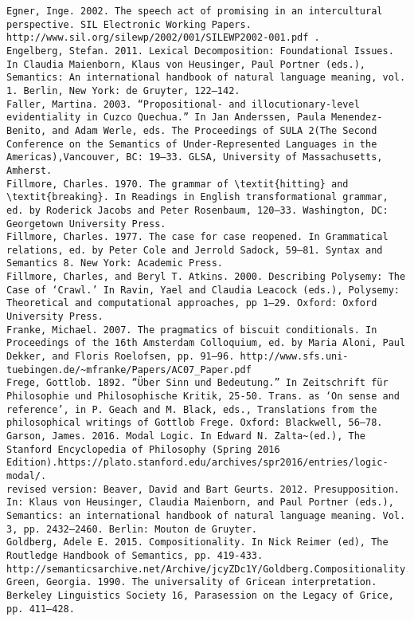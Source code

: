 \begin{verbatim}
Egner, Inge. 2002. The speech act of promising in an intercultural perspective. SIL Electronic Working Papers. http://www.sil.org/silewp/2002/001/SILEWP2002-001.pdf .
Engelberg, Stefan. 2011. Lexical Decomposition: Foundational Issues. In Claudia Maienborn, Klaus von Heusinger, Paul Portner (eds.), Semantics: An international handbook of natural language meaning, vol. 1. Berlin, New York: de Gruyter, 122–142.
Faller, Martina. 2003. “Propositional- and illocutionary-level evidentiality in Cuzco Quechua.” In Jan Anderssen, Paula Menendez-Benito, and Adam Werle, eds. The Proceedings of SULA 2(The Second Conference on the Semantics of Under-Represented Languages in the Americas),Vancouver, BC: 19–33. GLSA, University of Massachusetts, Amherst.
Fillmore, Charles. 1970. The grammar of \textit{hitting} and \textit{breaking}. In Readings in English transformational grammar, ed. by Roderick Jacobs and Peter Rosenbaum, 120–33. Washington, DC: Georgetown University Press.
Fillmore, Charles. 1977. The case for case reopened. In Grammatical relations, ed. by Peter Cole and Jerrold Sadock, 59–81. Syntax and Semantics 8. New York: Academic Press.
Fillmore, Charles, and Beryl T. Atkins. 2000. Describing Polysemy: The Case of ‘Crawl.’ In Ravin, Yael and Claudia Leacock (eds.), Polysemy: Theoretical and computational approaches, pp 1–29. Oxford: Oxford University Press.
Franke, Michael. 2007. The pragmatics of biscuit conditionals. In Proceedings of the 16th Amsterdam Colloquium, ed. by Maria Aloni, Paul Dekker, and Floris Roelofsen, pp. 91–96. http://www.sfs.uni-tuebingen.de/~mfranke/Papers/AC07_Paper.pdf
Frege, Gottlob. 1892. “Über Sinn und Bedeutung.” In Zeitschrift für Philosophie und Philosophische Kritik, 25-50. Trans. as ‘On sense and reference’, in P. Geach and M. Black, eds., Translations from the philosophical writings of Gottlob Frege. Oxford: Blackwell, 56–78.
Garson, James. 2016. Modal Logic. In Edward N. Zalta~(ed.), The Stanford Encyclopedia of Philosophy (Spring 2016 Edition).https://plato.stanford.edu/archives/spr2016/entries/logic-modal/.
revised version: Beaver, David and Bart Geurts. 2012. Presupposition. In: Klaus von Heusinger, Claudia Maienborn, and Paul Portner (eds.), Semantics: an international handbook of natural language meaning. Vol. 3, pp. 2432–2460. Berlin: Mouton de Gruyter.
Goldberg, Adele E. 2015. Compositionality. In Nick Reimer (ed), The Routledge Handbook of Semantics, pp. 419-433.
http://semanticsarchive.net/Archive/jcyZDc1Y/Goldberg.Compositionality.RoutledgeHandbook.pdf
Green, Georgia. 1990. The universality of Gricean interpretation. Berkeley Linguistics Society 16, Parasession on the Legacy of Grice, pp. 411–428.

\end{verbatim}
